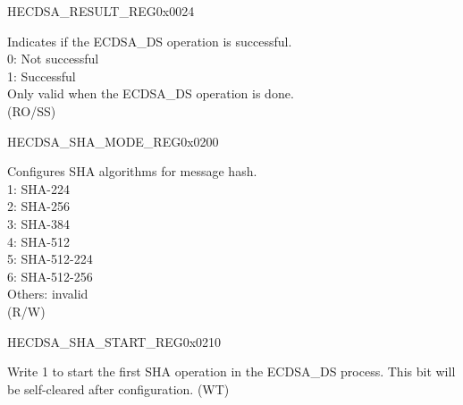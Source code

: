 \begin{register}{H}{ECDSA\_RESULT\_REG}{0x0024}\label{regdesc:ECDSARESULTREG}
%
%
\regnewline%
\begin{regdesc}\begin{reglist}
\label{fielddesc:ECDSAOPERATIONRESULT}\item [ECDSA\_OPERATION\_RESULT] Indicates if the ECDSA\_DS operation is successful.\\
0: Not successful\\
1: Successful\\
Only valid when the ECDSA\_DS operation is done. \\
(RO/SS)
\end{reglist}\end{regdesc}
\end{register}


\begin{register}{H}{ECDSA\_SHA\_MODE\_REG}{0x0200}\label{regdesc:ECDSASHAMODEREG}
%
%
\regnewline%
\begin{regdesc}\begin{reglist}
\label{fielddesc:ECDSASHAMODE}\item [ECDSA\_SHA\_MODE] Configures SHA algorithms for message hash. \\
1: SHA-224\\
2: SHA-256\\
3: SHA-384\\
4: SHA-512\\
5: SHA-512-224\\
6: SHA-512-256\\
Others: invalid\\
(R/W)
\end{reglist}\end{regdesc}
\end{register}


\begin{register}{H}{ECDSA\_SHA\_START\_REG}{0x0210}\label{regdesc:ECDSASHASTARTREG}
%
%
\regnewline%
\begin{regdesc}\begin{reglist}
\label{fielddesc:ECDSASHASTART}\item [ECDSA\_SHA\_START] Write 1 to start the first SHA operation in the ECDSA\_DS process. This bit will be self-cleared after configuration. (WT)
\end{reglist}\end{regdesc}
\end{register}


